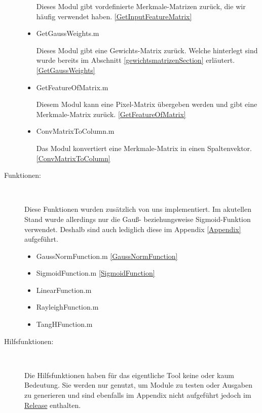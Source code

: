 \begin{description}
\begin{itemize}
		Dieses Modul gibt vordefinierte Merkmale-Matrizen zurück, die wir häufig verwendet haben. \ref{GetInputFeatureMatrix}
		
		\item GetGaussWeights.m  
		
		Dieses Modul gibt eine Gewichts-Matrix zurück. Welche hinterlegt sind wurde bereits im Abschnitt \ref{gewichtsmatrizenSection} erläutert. \ref{GetGaussWeights}
		
		\item GetFeatureOfMatrix.m  
		
		Diesem Modul kann eine Pixel-Matrix übergeben werden und gibt eine Merkmale-Matrix zurück. \ref{GetFeatureOfMatrix}
		
		\item ConvMatrixToColumn.m  
		
		Das Modul konvertiert eine Merkmale-Matrix in einen Spaltenvektor. \ref{ConvMatrixToColumn}
		
	\end{itemize}
	
	\item[Funktionen:]~\par
	
	Diese Funktionen wurden zusätzlich von uns implementiert. Im akutellen Stand wurde allerdings nur die Gauß- beziehungsweise Sigmoid-Funktion verwendet. Deshalb sind auch lediglich diese im Appendix \ref{Appendix} aufgeführt.
	
	\begin{itemize}
		\item GaussNormFunction.m \ref{GaussNormFunction}
		\item SigmoidFunction.m \ref{SigmoidFunction}
		\item LinearFunction.m
		\item RayleighFunction.m
		\item TangHFunction.m
	\end{itemize}
\newpage
	\item[Hilfsfunktionen:]~\par
	
	Die Hilfsfunktionen haben für das eigentliche Tool keine oder kaum Bedeutung. Sie werden nur genutzt, um Module zu testen oder Ausgaben zu generieren und sind ebenfalls im Appendix nicht aufgeführt jedoch im \href{https://github.com/TonightsCoding/MachineLearning/releases/tag/v1.0.0}{Release} enthalten.
	

\end{description}

